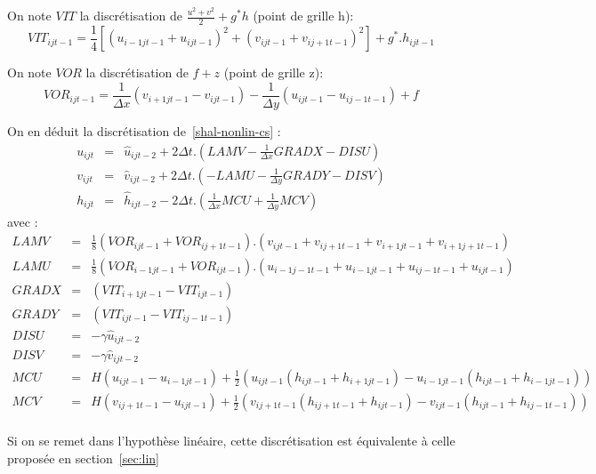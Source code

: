 \documentclass[a4paper,12pt]{article}
\begin{document}
On note $VIT$ la discrétisation de  $\frac{u^2+v^2}{2} + g^*h$ (point de grille h):
\begin{equation*}
VIT_{ijt-1} = \frac{1}{4} [(u_{i-1jt-1} + u_{ijt-1})^2+(v_{ijt-1} + v_{ij+1t-1})^2] + g^*.h_{ijt-1}
\end{equation*}

On note $VOR$ la discrétisation de $f+z$ (point de grille z):
\begin{equation*}
VOR_{ijt-1} = \frac{1}{\Delta x}(v_{i+1jt-1} - v_{ijt-1}) - \frac{1}{\Delta y}(u_{ijt-1}-u_{ij-1t-1}) + f 
\end{equation*}

On en déduit la discrétisation de~\ref{shal-nonlin-cs} :
\begin{eqnarray*}
u_{ijt} & = & \hat{u}_{ijt-2}+2\Delta t. (LAMV -  \frac{1}{\Delta x}GRADX - DISU ) \\
v_{ijt} & = & \hat{v}_{ijt-2}+2\Delta t. (- LAMU -  \frac{1}{\Delta y}GRADY - DISV ) \\
h_{ijt} & = & \hat{h}_{ijt-2}-2\Delta t . ( \frac{1}{\Delta x}MCU + \frac{1}{\Delta y}MCV)
\end{eqnarray*}
avec : 
\begin{eqnarray*}
LAMV & = & \frac{1}{8}(VOR_{ijt-1}+VOR_{ij+1t-1}).(v_{ijt-1}+v_{ij+1t-1}+v_{i+1jt-1}+v_{i+1j+1t-1})\\
LAMU & = & \frac{1}{8}(VOR_{i-1jt-1}+VOR_{ijt-1}).(u_{i-1j-1t-1}+u_{i-1jt-1}+u_{ij-1t-1}+u_{ijt-1})\\
GRADX & = &(VIT_{i+1jt-1}-VIT_{ijt-1})\\
GRADY & = &(VIT_{ijt-1}-VIT_{ij-1t-1})\\
DISU & = &  -\gamma                \hat{u}_{ijt-2}\\
DISV & = & -\gamma                \hat{v}_{ijt-2}\\
MCU  & = & H(u_{ijt-1} - u_{i-1jt-1}) + \frac{1}{2}
(u_{ijt-1}(h_{ijt-1}+h_{i+1jt-1}) - u_{i-1jt-1}(h_{ijt-1}+h_{i-1jt-1}))\\
MCV  & = & H(v_{ij+1t-1} - u_{ijt-1}) + \frac{1}{2}
(v_{ij+1t-1}(h_{ij+1t-1}+h_{ijt-1}) - v_{ijt-1}(h_{ijt-1}+h_{ij-1t-1}))\\
\end{eqnarray*}

Si on se remet dans l'hypothèse linéaire, cette discrétisation est équivalente à celle proposée en section~\ref{sec:lin}
\end{document}
